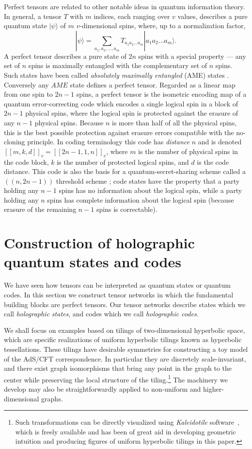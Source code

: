 \documentclass[12pt]{article}
\theoremstyle{plain}
\theoremstyle{plain}
\theoremstyle{plain}
\theoremstyle{plain}
\theoremstyle{result}
\theoremstyle{remark}
\theoremstyle{conjecture}
\theoremstyle{observation}
\theoremstyle{definition}
\theoremstyle{corollary}
\theoremstyle{definition}
\theoremstyle{definition}
\theoremstyle{assumption}
\theoremstyle{definition}
\theoremstyle{problem}
\theoremstyle{fact}
\newcommand{\be}{\begin{equation}}
\newcommand{\ee}{\end{equation}}
\newcommand{\ran}{\rangle}
\begin{document}
Perfect tensors are related to other notable ideas in quantum information theory.  In general, a tensor $T$ with $m$ indices, each ranging over $v$ values, describes a pure quantum state $|\psi\ran$ of $m$ $v$-dimensional spins, where, up to a normalization factor,
\be
|\psi\rangle = \sum_{a_1,a_2, \ldots, a_m} T_{a_1a_2 \ldots a_m} |a_1a_2 \ldots a_m\ran. 
\ee
A perfect tensor describes a pure state of $2n$ spins with a special property ---  any set of $n$ spins is maximally entangled with the complementary set of $n$ spins. Such states have been called \textit{absolutely maximally entangled} (AME) states \cite{Helwig2012,Helwig2013}.  
Conversely any $AME$ state defines a perfect tensor. Regarded as a linear map from one spin to $2n-1$ spins, a perfect tensor is the isometric encoding map of a quantum error-correcting code which encodes a single logical spin in a block of $2n-1$ physical spins, where the logical spin is protected against the erasure of any $n-1$ physical spins. 
Because $n$ is more than half of all the physical spins, this is the best possible protection against erasure errors compatible with the no-cloning principle.  In coding terminology this code has \textit{distance} $n$ and is denoted $[[m,k,d]]_v=[[2n-1,1,n]]_v$, where $m$ is the number of physical spins in the code block, $k$ is the number of protected logical spins, and $d$ is the code distance. 
This code is also the basis for a quantum-secret-sharing scheme called a $((n,2n-1))$ threshold scheme \cite{Cleve1999}; code states have the property that a party holding any $n-1$ spins has no information about the logical spin, while a party holding any $n$ spins has complete information about the logical spin (because erasure of the remaining $n-1$ spins is correctable). 


\section{Construction of holographic quantum states and codes}\label{sec:model}

We have seen how tensors can be interpreted as quantum states or quantum codes. In this section we construct tensor networks in which the fundamental building blocks are perfect tensors. Our tensor networks describe states which we call \textit{holographic states}, and codes which we call \textit{holographic codes}.  

We shall focus on examples based on tilings of two-dimensional hyperbolic space, which are specific realizations of uniform hyperbolic tilings known as hyperbolic tessellations. These tilings have desirable symmetries for constructing a toy model of the AdS/CFT correspondence. In particular they are discretely scale-invariant, and there exist graph isomorphisms that bring any point in the graph to the center while preserving the local structure of the tiling.\footnote{Such transformations can be directly visualized using \emph{Kaleidotile} software~\cite{Kaleidotile}, which is freely available and has been of great aid in developing geometric intuition and producing figures of uniform hyperbolic tilings in this paper.} The machinery we develop may also be straightforwardly applied to non-uniform and higher-dimensional graphs. 
\end{document}
